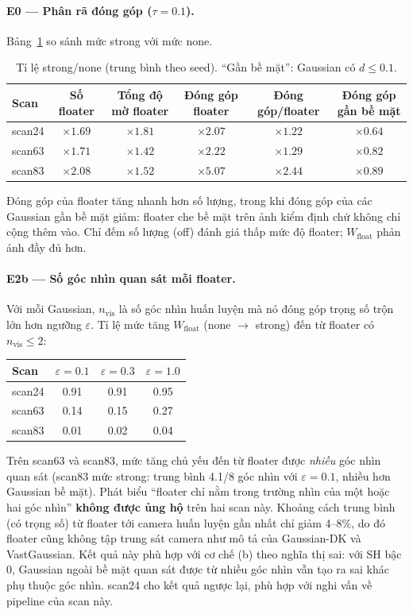 \documentclass[11pt,a4paper]{article}
\begin{document}
\paragraph{E0 --- Phân rã đóng góp ($\tau=0.1$).} Bảng~\ref{tab:decomp} so sánh mức strong với mức none.
\begin{table}[H]
\centering\small
\caption{Tỉ lệ strong/none (trung bình theo seed). ``Gần bề mặt'': Gaussian có $d\le 0.1$.}
\label{tab:decomp}
\begin{tabular}{@{}lccccc@{}}
\toprule
Scan & Số floater & Tổng độ mờ floater & Đóng góp floater & Đóng góp/floater & Đóng góp gần bề mặt \\
\midrule
scan24 & $\times 1.69$ & $\times 1.81$ & $\times 2.07$ & $\times 1.22$ & $\times 0.64$ \\
scan63 & $\times 1.71$ & $\times 1.42$ & $\times 2.22$ & $\times 1.29$ & $\times 0.82$ \\
scan83 & $\times 2.08$ & $\times 1.52$ & $\times 5.07$ & $\times 2.44$ & $\times 0.89$ \\
\bottomrule
\end{tabular}
\end{table}
Đóng góp của floater tăng nhanh hơn số lượng, trong khi đóng góp của các Gaussian gần bề mặt giảm: floater che bề mặt trên ảnh kiểm định chứ không chỉ cộng thêm vào. Chỉ đếm số lượng (off) đánh giá thấp mức độ floater; $W_{\text{float}}$ phản ánh đầy đủ hơn.

\paragraph{E2b --- Số góc nhìn quan sát mỗi floater.} Với mỗi Gaussian, $n_{\text{vis}}$ là số góc nhìn huấn luyện mà nó đóng góp trọng số trộn lớn hơn ngưỡng $\varepsilon$. Tỉ lệ mức tăng $W_{\text{float}}$ (none $\to$ strong) đến từ floater có $n_{\text{vis}}\le 2$:
\begin{table}[H]
\centering\small
\begin{tabular}{@{}lccc@{}}
\toprule
Scan & $\varepsilon=0.1$ & $\varepsilon=0.3$ & $\varepsilon=1.0$ \\
\midrule
scan24 & 0.91 & 0.91 & 0.95 \\
scan63 & 0.14 & 0.15 & 0.27 \\
scan83 & 0.01 & 0.02 & 0.04 \\
\bottomrule
\end{tabular}
\end{table}
Trên scan63 và scan83, mức tăng chủ yếu đến từ floater được \emph{nhiều} góc nhìn quan sát (scan83 mức strong: trung bình 4.1/8 góc nhìn với $\varepsilon=0.1$, nhiều hơn Gaussian bề mặt). Phát biểu ``floater chỉ nằm trong trường nhìn của một hoặc hai góc nhìn'' \textbf{không được ủng hộ} trên hai scan này. Khoảng cách trung bình (có trọng số) từ floater tới camera huấn luyện gần nhất chỉ giảm 4--8\%, do đó floater cũng không tập trung sát camera như mô tả của Gaussian-DK và VastGaussian. Kết quả này phù hợp với cơ chế (b) theo nghĩa thị sai: với SH bậc 0, Gaussian ngoài bề mặt quan sát được từ nhiều góc nhìn vẫn tạo ra sai khác phụ thuộc góc nhìn. scan24 cho kết quả ngược lại, phù hợp với nghi vấn về pipeline của scan này.
\end{document}
